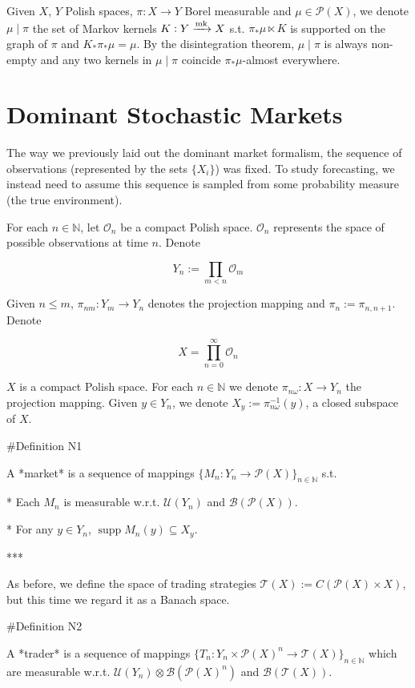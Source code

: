 \documentclass[a4paper]{article}
\DeclareMathOperator{\Supp}{supp}
\newcommand{\Nats}{\mathbb{N}}
\newcommand{\Markov}{\xrightarrow{\textnormal{mk}}}
\newcommand{\Prob}{\mathcal{P}}
\newcommand{\Ob}{\mathcal{O}}
\newcommand{\T}{\mathcal{T}}
\newcommand{\B}{\mathcal{B}}
\newcommand{\UM}{\mathcal{U}}
\begin{document}
Given ${X}$, ${Y}$ Polish spaces, ${\pi: X \rightarrow Y}$ Borel measurable and ${\mu \in \Prob(X)}$, we denote ${\mu \mid \pi}$ the set of Markov kernels ${K: Y \Markov X}$ s.t. ${\pi_* \mu \ltimes K}$ is supported on the graph of ${\pi}$ and ${K_*\pi_* \mu = \mu}$. By the disintegration theorem, ${\mu \mid \pi}$ is always non-empty and any two kernels in ${\mu \mid \pi}$ coincide ${\pi_*\mu}$-almost everywhere.

\section{Dominant Stochastic Markets}

The way we previously laid out the dominant market formalism, the sequence of observations (represented by the sets $\{X_i\}$) was fixed. To study forecasting, we instead need to assume this sequence is sampled from some probability measure (the true environment).

For each ${n \in \Nats}$, let ${\Ob_n}$ be a compact Polish space. ${\Ob_n}$ represents the space of possible observations at time ${n}$. Denote 

$${Y_n:=\prod_{m < n} \Ob_m}$$

Given ${n \leq m}$, ${\pi_{nm}: Y_m \rightarrow Y_n}$ denotes the projection mapping and ${\pi_n:=\pi_{n,n+1}}$. Denote 

$${X = \prod_{n = 0}^\infty \Ob_n}$$

${X}$ is a compact Polish space. For each ${n \in \Nats}$ we denote ${\pi_{n\omega}: X \rightarrow Y_n}$ the projection mapping. Given ${y \in Y_n}$, we denote ${X_y:=\pi_{n\omega}^{-1}(y)}$, a closed subspace of ${X}$.

\#Definition N1

A *market* is a sequence of mappings ${\{M_n: Y_n \rightarrow \Prob(X)\}}_{n \in \Nats}$ s.t.

* Each ${M_n}$ is measurable w.r.t. ${\UM(Y_n)}$ and ${\B(\Prob(X))}$.

* For any ${y \in Y_n}$, ${\Supp M_n(y) \subseteq X_y}$.

***

As before, we define the space of trading strategies ${\T(X):=C(\Prob(X)\times X)}$, but this time we regard it as a Banach space. 

\#Definition N2

A *trader* is a sequence of mappings ${\{T_n: Y_n \times \Prob(X)^n \rightarrow \T(X)\}}_{n \in \Nats}$ which are measurable w.r.t. ${\UM(Y_n) \otimes \B(\Prob(X)^n)}$ and ${\B(\T(X))}$.
\end{document}
